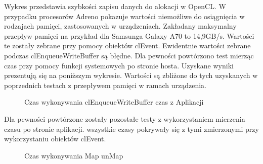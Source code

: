 Wykres przedstawia szybkości zapisu danych do alokacji w OpenCL. W przypadku procesorów Adreno pokazuje wartości niemożliwe do osiągnięcia w rodzajach pamięci, zastosowanych w urządzeniach. Zakładany maksymalny przepływ pamięci na przykład dla Samsunga Galaxy A70 to 14,9GB/s. Wartości te zostały zebrane przy pomocy obiektów clEvent. Ewidentnie wartości zebrane podczas clEnqueueWriteBuffer są błędne. Dla pewności powtórzono test mierząc czas przy pomocy funkcji systemowych po stronie hosta. Uzyskane wyniki prezentują się na poniższym wykresie. Wartości są zbliżone do tych uzyskanych w poprzednich testach z przepływem pamięci w ramach urządzenia.
\begin{figure}[H]
\caption{Czas wykonywania clEnqueueWriteBuffer czas z Aplikacji}
\end{figure} 

Dla pewności powtórzone zostały pozostałe testy z wykorzystaniem mierzenia czasu po stronie aplikacji. wszystkie czasy pokrywały się z tymi zmierzonymi przy wykorzystaniu obiektów clEvent.

\begin{figure}[H]
\caption{Czas wykonywania Map unMap}
\end{figure}

